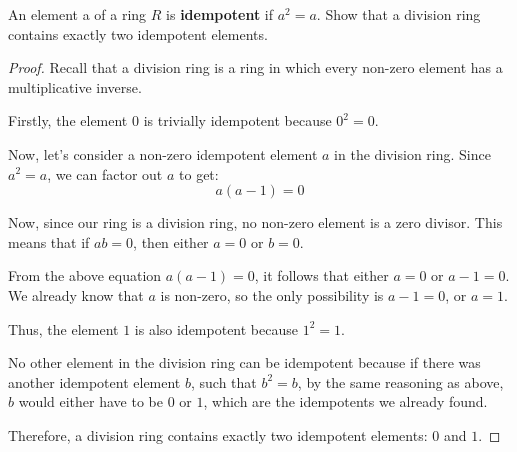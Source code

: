 \documentclass[12pt]{amsart}
\theoremstyle{definition}
\numberwithin{equation}{section}
\theoremstyle{plain}
\begin{document}
\begin{exercise}{23} An element a of a ring $R$ is \textbf{idempotent} if $a^2 = a$. Show that a division ring contains exactly two idempotent elements.

    \begin{proof}
    Recall that a division ring is a ring in which every non-zero element has a multiplicative inverse. 
    
    Firstly, the element \( 0 \) is trivially idempotent because \( 0^2 = 0 \).
    
    Now, let's consider a non-zero idempotent element \( a \) in the division ring. Since \( a^2 = a \), we can factor out \( a \) to get:
    \[ a(a - 1) = 0 \]
    
    Now, since our ring is a division ring, no non-zero element is a zero divisor. This means that if \( ab = 0 \), then either \( a = 0 \) or \( b = 0 \). 
    
    From the above equation \( a(a - 1) = 0 \), it follows that either \( a = 0 \) or \( a - 1 = 0 \). We already know that \( a \) is non-zero, so the only possibility is \( a - 1 = 0 \), or \( a = 1 \).
    
    Thus, the element \( 1 \) is also idempotent because \( 1^2 = 1 \).
    
    No other element in the division ring can be idempotent because if there was another idempotent element \( b \), such that \( b^2 = b \), by the same reasoning as above, \( b \) would either have to be \( 0 \) or \( 1 \), which are the idempotents we already found.
    
    Therefore, a division ring contains exactly two idempotent elements: \( 0 \) and \( 1 \).
    
    \end{proof}
\end{exercise}
\vspace*{40pt}
\end{document}
